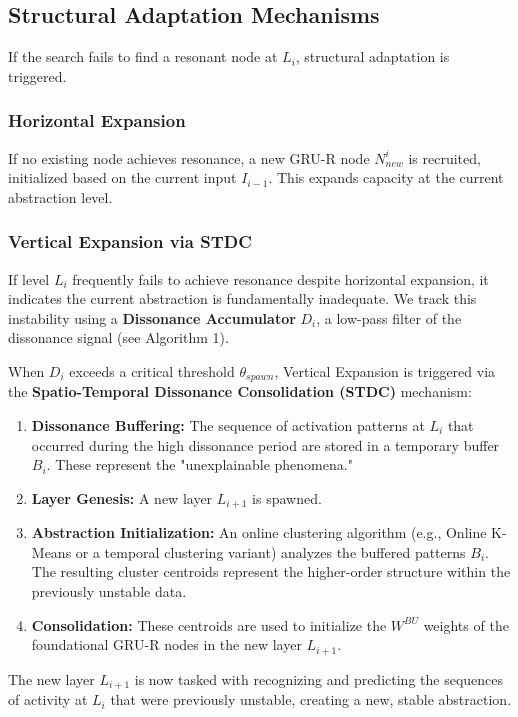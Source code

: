 \documentclass{article}
\begin{document}
\subsection{Structural Adaptation Mechanisms}

If the search fails to find a resonant node at $L_i$, structural adaptation is triggered.

\subsubsection{Horizontal Expansion}
If no existing node achieves resonance, a new GRU-R node $N_{new}^i$ is recruited, initialized based on the current input $I_{i-1}$. This expands capacity at the current abstraction level.

\subsubsection{Vertical Expansion via STDC}
If level $L_i$ frequently fails to achieve resonance despite horizontal expansion, it indicates the current abstraction is fundamentally inadequate. We track this instability using a \textbf{Dissonance Accumulator} $D_i$, a low-pass filter of the dissonance signal (see Algorithm 1).

When $D_i$ exceeds a critical threshold $\theta_{spawn}$, Vertical Expansion is triggered via the \textbf{Spatio-Temporal Dissonance Consolidation (STDC)} mechanism:

\begin{enumerate}
    \item \textbf{Dissonance Buffering:} The sequence of activation patterns at $L_i$ that occurred during the high dissonance period are stored in a temporary buffer $B_i$. These represent the "unexplainable phenomena."
    \item \textbf{Layer Genesis:} A new layer $L_{i+1}$ is spawned.
    \item \textbf{Abstraction Initialization:} An online clustering algorithm (e.g., Online K-Means or a temporal clustering variant) analyzes the buffered patterns $B_i$. The resulting cluster centroids represent the higher-order structure within the previously unstable data.
    \item \textbf{Consolidation:} These centroids are used to initialize the $W^{BU}$ weights of the foundational GRU-R nodes in the new layer $L_{i+1}$.
\end{enumerate}
The new layer $L_{i+1}$ is now tasked with recognizing and predicting the sequences of activity at $L_i$ that were previously unstable, creating a new, stable abstraction.
\end{document}
